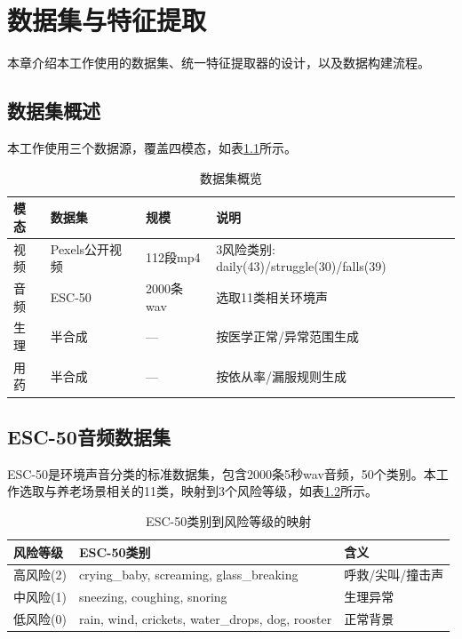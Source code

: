 \chapter{数据集与特征提取}
\label{chap:data}

本章介绍本工作使用的数据集、统一特征提取器的设计，以及数据构建流程。

\section{数据集概述}

本工作使用三个数据源，覆盖四模态，如表\ref{tab:datasets}所示。

\begin{table}[H]
\centering
\caption{数据集概览}
\label{tab:datasets}
\begin{tabular}{llll}
\toprule
模态 & 数据集 & 规模 & 说明 \\
\midrule
视频 & Pexels公开视频 & 112段mp4 & 3风险类别: daily(43)/struggle(30)/falls(39) \\
音频 & ESC-50 & 2000条wav & 选取11类相关环境声 \\
生理 & 半合成 & --- & 按医学正常/异常范围生成 \\
用药 & 半合成 & --- & 按依从率/漏服规则生成 \\
\bottomrule
\end{tabular}
\end{table}

\section{ESC-50音频数据集}

ESC-50\cite{piczak2015esc}是环境声音分类的标准数据集，包含2000条5秒wav音频，50个类别。本工作选取与养老场景相关的11类，映射到3个风险等级，如表\ref{tab:esc50}所示。

\begin{table}[H]
\centering
\caption{ESC-50类别到风险等级的映射}
\label{tab:esc50}
\begin{tabular}{lll}
\toprule
风险等级 & ESC-50类别 & 含义 \\
\midrule
高风险(2) & crying\_baby, screaming, glass\_breaking & 呼救/尖叫/撞击声 \\
中风险(1) & sneezing, coughing, snoring & 生理异常 \\
低风险(0) & rain, wind, crickets, water\_drops, dog, rooster & 正常背景 \\
\bottomrule
\end{tabular}
\end{table}

